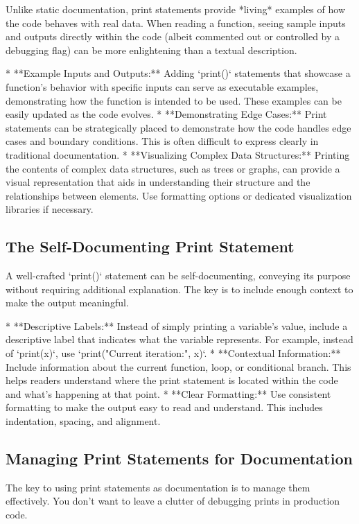 \documentclass{article}
\begin{document}
{{{{Unlike static documentation, print statements provide *living* examples of how the code behaves with real data. When reading a function, seeing sample inputs and outputs directly within the code (albeit commented out or controlled by a debugging flag) can be more enlightening than a textual description.

*   **Example Inputs and Outputs:**  Adding `print()` statements that showcase a function's behavior with specific inputs can serve as executable examples, demonstrating how the function is intended to be used. These examples can be easily updated as the code evolves.
*   **Demonstrating Edge Cases:**  Print statements can be strategically placed to demonstrate how the code handles edge cases and boundary conditions.  This is often difficult to express clearly in traditional documentation.
*   **Visualizing Complex Data Structures:**  Printing the contents of complex data structures, such as trees or graphs, can provide a visual representation that aids in understanding their structure and the relationships between elements.  Use formatting options or dedicated visualization libraries if necessary.

\subsection*{The Self-Documenting Print Statement}

A well-crafted `print()` statement can be self-documenting, conveying its purpose without requiring additional explanation. The key is to include enough context to make the output meaningful.

*   **Descriptive Labels:**  Instead of simply printing a variable's value, include a descriptive label that indicates what the variable represents. For example, instead of `print(x)`, use `print("Current iteration:", x)`.
*   **Contextual Information:**  Include information about the current function, loop, or conditional branch. This helps readers understand where the print statement is located within the code and what's happening at that point.
*   **Clear Formatting:**  Use consistent formatting to make the output easy to read and understand.  This includes indentation, spacing, and alignment.

\subsection*{Managing Print Statements for Documentation}

The key to using print statements as documentation is to manage them effectively. You don't want to leave a clutter of debugging prints in production code.

}}}}
\end{document}
